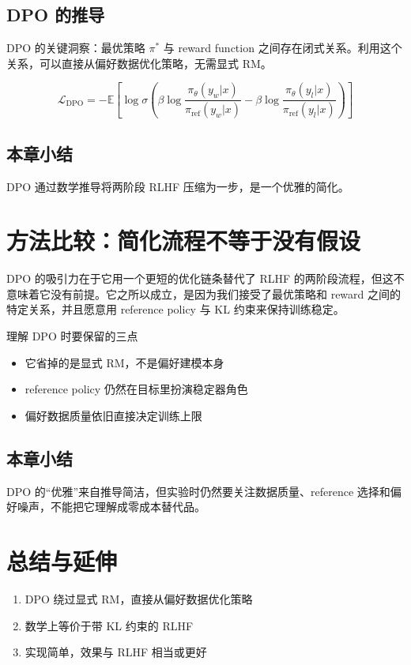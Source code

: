 \documentclass[a4paper]{article}
\begin{document}
\subsection{DPO 的推导}
DPO 的关键洞察：最优策略 $\pi^*$ 与 reward function 之间存在闭式关系。利用这个关系，可以直接从偏好数据优化策略，无需显式 RM。

$$\mathcal{L}_{\text{DPO}} = -\mathbb{E}\left[\log \sigma\left(\beta \log \frac{\pi_\theta(y_w|x)}{\pi_{\text{ref}}(y_w|x)} - \beta \log \frac{\pi_\theta(y_l|x)}{\pi_{\text{ref}}(y_l|x)}\right)\right]$$

\subsection{本章小结}
DPO 通过数学推导将两阶段 RLHF 压缩为一步，是一个优雅的简化。

\newpage
\section{方法比较：简化流程不等于没有假设}
DPO 的吸引力在于它用一个更短的优化链条替代了 RLHF 的两阶段流程，但这不意味着它没有前提。它之所以成立，是因为我们接受了最优策略和 reward 之间的特定关系，并且愿意用 reference policy 与 KL 约束来保持训练稳定。

\begin{knowledgebox}{理解 DPO 时要保留的三点}
\begin{itemize}
  \item 它省掉的是显式 RM，不是偏好建模本身
  \item reference policy 仍然在目标里扮演稳定器角色
  \item 偏好数据质量依旧直接决定训练上限
\end{itemize}
\end{knowledgebox}

\subsection{本章小结}
DPO 的“优雅”来自推导简洁，但实验时仍然要关注数据质量、reference 选择和偏好噪声，不能把它理解成零成本替代品。

\newpage
\section{总结与延伸}
\begin{enumerate}
  \item DPO 绕过显式 RM，直接从偏好数据优化策略
  \item 数学上等价于带 KL 约束的 RLHF
  \item 实现简单，效果与 RLHF 相当或更好
\end{enumerate}
\end{document}
